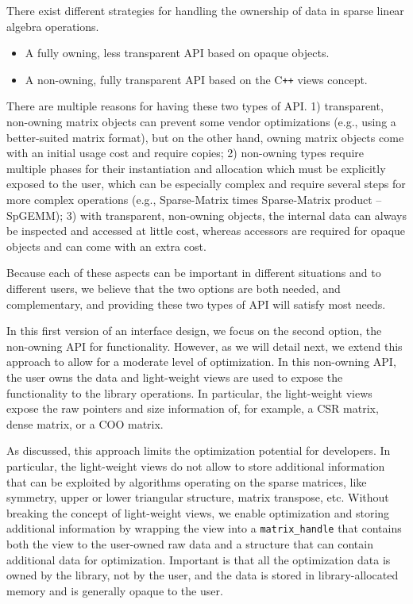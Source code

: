 \documentclass{article}
\newcommand{\cplusplus}{C\texttt{++}\xspace}
\begin{document}
There exist different strategies for handling the ownership of data in sparse linear algebra operations. 
\begin{itemize}
\item A fully owning, less transparent API based on opaque objects.
\item A non-owning, fully transparent API based on the \cplusplus views concept.
\end{itemize}

There are multiple reasons for having these two types of API. 1) transparent, non-owning matrix objects can prevent some vendor optimizations (e.g., using a better-suited matrix format), but on the other hand, owning matrix objects come with an initial usage cost and require copies; 2) non-owning types require multiple phases for their instantiation and allocation which must be explicitly exposed to the user, which can be especially complex and require several steps for more complex operations (e.g., Sparse-Matrix times Sparse-Matrix product -- SpGEMM); 3) with transparent, non-owning objects, the internal data can always be inspected and accessed at little cost, whereas accessors are required for opaque objects and can come with an extra cost.

Because each of these aspects can be important in different situations and to different users, we believe that the two options are both needed, and complementary, and providing these two types of API will satisfy most needs.

In this first version of an interface design, 
we focus on the second option, the non-owning API for functionality. However, as we will detail next, we extend this approach to allow for a moderate level of optimization. 
In this non-owning API, the user owns the data and light-weight views are used to expose the functionality to the library operations. In particular, the light-weight views expose the raw pointers and size information of, for example, a CSR matrix, dense matrix, or a COO matrix.

As discussed, this approach limits the optimization potential for developers. 
In particular, the light-weight views do not allow to 
store additional information that can be exploited
by algorithms operating on the sparse matrices, like symmetry, upper or lower triangular structure, matrix transpose, etc. 
Without breaking the concept of light-weight views, 
we enable optimization and storing additional information by wrapping the view into a \texttt{matrix\_handle} that contains both the view to the user-owned raw data and a structure that can contain additional data for optimization. Important is that all the optimization data is owned by the library, not by the user, and the data is stored in library-allocated memory and is generally opaque to the user.
\end{document}
